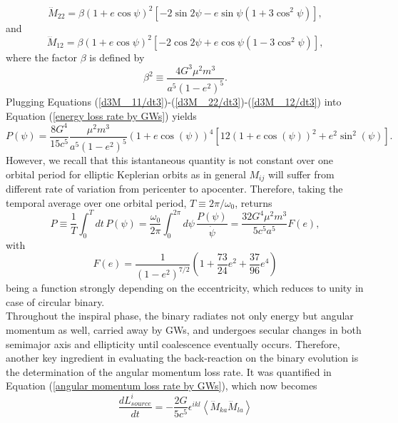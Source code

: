 \documentclass[12pt,twoside,openany]{book}
\begin{document}
\begin{equation}\label{d3M _22/dt3}  
    \dddot{M}_{22} = \beta (1 + e \cos \psi)^2 \left[ -2 \sin 2\psi - e \sin \psi (1 + 3 \cos^2 \psi) \right],
\end{equation}
and
\begin{equation}\label{d3M _12/dt3}
    \dddot{M}_{12} = \beta (1 + e \cos \psi)^2 \left[ -2 \cos 2\psi + e \cos \psi (1 - 3 \cos^2 \psi) \right],
\end{equation}
where the factor $\beta$ is defined by
\begin{equation}
\beta^2 \equiv \frac{4 G^3 \mu^2 m^3}{a^5 (1 - e^2)^5}. 
\end{equation}
Plugging Equations (\ref{d3M _11/dt3})-(\ref{d3M _22/dt3})-(\ref{d3M _12/dt3}) into Equation (\ref{energy loss rate by GWs}) yields
\begin{equation}
    P(\psi)=\frac{8G^4}{15c^5}\frac{\mu^2m^3}{a^5(1-e^2)^5}(1+e\cos(\psi))^4[12(1+e\cos(\psi))^2+e^2\sin^2(\psi)].
\end{equation}
However, we recall that this istantaneous quantity is not constant over one orbital period for elliptic Keplerian orbits as in general $M_{ij}$ will suffer from different rate of variation from pericenter to apocenter. Therefore, taking the temporal average over one orbital period, $T\equiv2\pi/\omega_0$, returns
\begin{equation}\label{P of GWs binary}
    P\equiv\frac{1}{T}\int_0^T dt\,P(\psi)=\frac{\omega_0}{2\pi}\int_0^{2\pi} d\psi\, \frac{P(\psi)}{\dot{\psi}}=\frac{32G^4\mu^2m^3}{5c^5a^5}F(e),
\end{equation}
with 
\begin{equation}\label{F(e) definition}
    F(e)=\frac{1}{(1-e^2)^{7/2}}\left(1+\frac{73}{24}e^2+\frac{37}{96}e^4\right)
\end{equation}
being a function strongly depending on the eccentricity, which reduces to unity in case of circular binary.\\Throughout the inspiral phase, the binary radiates not only energy but angular momentum as well, carried away by GWs, and undergoes secular changes in both semimajor axis and ellipticity until coalescence eventually occurs. Therefore, another key ingredient in evaluating the back-reaction on the binary evolution is the determination of the angular momentum loss rate. It was quantified in Equation (\ref{angular momentum loss rate by GWs}), which now becomes
\begin{equation}\label{angular momentum loss rate in terms of M_ij}
    \frac{dL^i_{source}}{dt}=-\frac{2G}{5c^5}\epsilon^{ikl}\left<\dddot{M}_{ka}\dddot{M}_{la}\right>
\end{equation}
\end{document}
